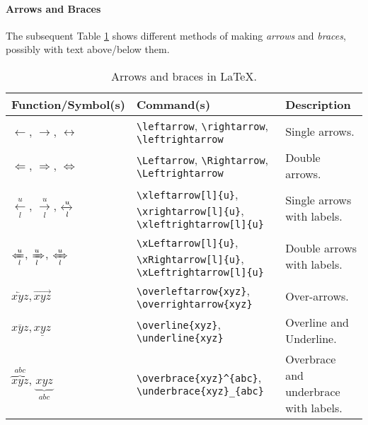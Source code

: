 \paragraph{Arrows and Braces} The subsequent Table \ref{tab:arrowbrace} shows different methods of making \textit{arrows} and \textit{braces}, possibly with text above/below them.

\begin{table}[ht!]
\begin{tabularx}{\textwidth}{|p{}|>{\raggedright}p{}|X|}
\hline
Function/Symbol(s) & Command(s) & Description \\
\hline
$\leftarrow$, $\rightarrow$, $\leftrightarrow$ & \texttt{\textbackslash leftarrow}, \texttt{\textbackslash rightarrow}, \texttt{\textbackslash leftrightarrow} & Single arrows. \\
\hline
$\Leftarrow$, $\Rightarrow$, $\Leftrightarrow$ & \texttt{\textbackslash Leftarrow}, \texttt{\textbackslash Rightarrow}, \texttt{\textbackslash Leftrightarrow} & Double arrows. \\
\hline
$\xleftarrow[l]{u}$, $\xrightarrow[l]{u}$, $\xleftrightarrow[l]{u}$ & \texttt{\textbackslash xleftarrow[l]\{u\}}, \texttt{\textbackslash xrightarrow[l]\{u\}}, \texttt{\textbackslash xleftrightarrow[l]\{u\}} & Single arrows with labels. \\
\hline
$\xLeftarrow[l]{u}$, $\xRightarrow[l]{u}$, $\xLeftrightarrow[l]{u}$ & \texttt{\textbackslash xLeftarrow[l]\{u\}}, \texttt{\textbackslash xRightarrow[l]\{u\}}, \texttt{\textbackslash xLeftrightarrow[l]\{u\}} & Double arrows with labels. \\
\hline
$\overleftarrow{xyz}, \overrightarrow{xyz}$ & \texttt{\textbackslash overleftarrow\{xyz\}}, \texttt{\textbackslash overrightarrow\{xyz\}} & Over-arrows. \\
\hline
$\overline{xyz}, \underline{xyz}$ & \texttt{\textbackslash overline\{xyz\}}, \texttt{\textbackslash underline\{xyz\}} & Overline and Underline. \\
\hline
$\overbrace{xyz}^{abc}$, $\underbrace{xyz}_{abc}$ & \texttt{\textbackslash overbrace\{xyz\}\^{}\{abc\}}, \texttt{\textbackslash underbrace\{xyz\}\_\{abc\}} & Overbrace and underbrace with labels. \\
\hline
\end{tabularx}
\caption{Arrows and braces in \LaTeX{}.}
\label{tab:arrowbrace}
\end{table}

